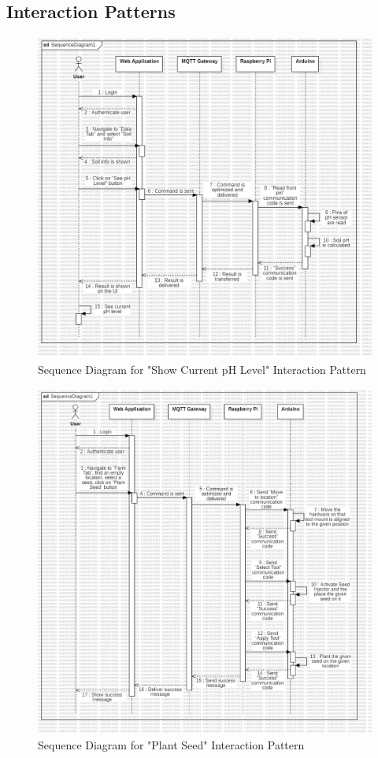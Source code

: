\newpage
\subsection{Interaction Patterns}
\begin{figure}[htbp]
    \centering
    \includegraphics[width=1\linewidth]{Figures/sequence1.jpg}
    \caption{Sequence Diagram for "Show Current pH Level" Interaction Pattern}
    \label{Sequence1}
\end{figure}
\begin{figure}[htbp]
    \centering
    \includegraphics[width=1\linewidth]{Figures/sequence2.jpg}
    \caption{Sequence Diagram for "Plant Seed" Interaction Pattern}
    \label{Sequence2}
\end{figure}

